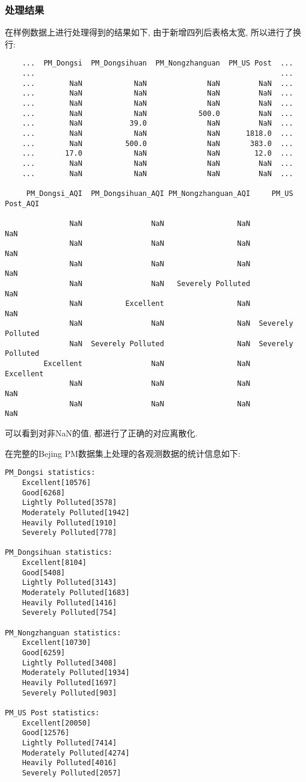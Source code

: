 \subsubsection{处理结果}
在样例数据上进行处理得到的结果如下, 由于新增四列后表格太宽, 所以进行了换行:
\begin{lstlisting}
    ...  PM_Dongsi  PM_Dongsihuan  PM_Nongzhanguan  PM_US Post  ...    
    ...                                                         ...
    ...        NaN            NaN              NaN         NaN  ...    
    ...        NaN            NaN              NaN         NaN  ...    
    ...        NaN            NaN              NaN         NaN  ...    
    ...        NaN            NaN            500.0         NaN  ...    
    ...        NaN           39.0              NaN         NaN  ...    
    ...        NaN            NaN              NaN      1818.0  ...    
    ...        NaN          500.0              NaN       383.0  ...    
    ...       17.0            NaN              NaN        12.0  ...    
    ...        NaN            NaN              NaN         NaN  ...    
    ...        NaN            NaN              NaN         NaN  ...    

     PM_Dongsi_AQI  PM_Dongsihuan_AQI PM_Nongzhanguan_AQI     PM_US Post_AQI
                                                                            
               NaN                NaN                 NaN                NaN
               NaN                NaN                 NaN                NaN
               NaN                NaN                 NaN                NaN
               NaN                NaN   Severely Polluted                NaN
               NaN          Excellent                 NaN                NaN
               NaN                NaN                 NaN  Severely Polluted
               NaN  Severely Polluted                 NaN  Severely Polluted
         Excellent                NaN                 NaN          Excellent
               NaN                NaN                 NaN                NaN
               NaN                NaN                 NaN                NaN
\end{lstlisting}
可以看到对非NaN的值, 都进行了正确的对应离散化.

在完整的Bejing PM数据集上处理的各观测数据的统计信息如下:
\begin{lstlisting}
PM_Dongsi statistics:
    Excellent[10576]
    Good[6268]
    Lightly Polluted[3578]
    Moderately Polluted[1942]
    Heavily Polluted[1910]
    Severely Polluted[778]

PM_Dongsihuan statistics:
    Excellent[8104]
    Good[5408]
    Lightly Polluted[3143]
    Moderately Polluted[1683]
    Heavily Polluted[1416]
    Severely Polluted[754]

PM_Nongzhanguan statistics:
    Excellent[10730]
    Good[6259]
    Lightly Polluted[3408]
    Moderately Polluted[1934]
    Heavily Polluted[1697]
    Severely Polluted[903]

PM_US Post statistics:
    Excellent[20050]
    Good[12576]
    Lightly Polluted[7414]
    Moderately Polluted[4274]
    Heavily Polluted[4016]
    Severely Polluted[2057]
\end{lstlisting}

